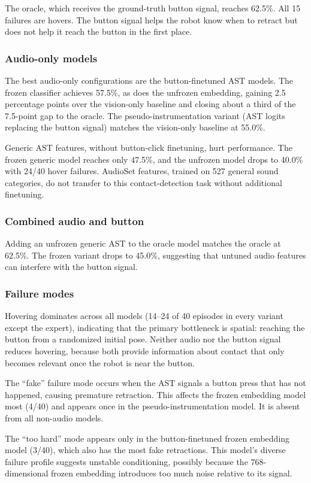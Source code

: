 \documentclass[conference]{IEEEtran}
\begin{document}
The oracle, which receives the ground-truth button signal, reaches 62.5\%.
All 15 failures are hovers.
The button signal helps the robot know when to retract but does not help it reach the button in the first place.

\subsubsection{Audio-only models}
The best audio-only configurations are the button-finetuned AST models.
The frozen classifier achieves 57.5\%, as does the unfrozen embedding, gaining 2.5 percentage points over the vision-only baseline and closing about a third of the 7.5-point gap to the oracle.
The pseudo-instrumentation variant (AST logits replacing the button signal) matches the vision-only baseline at 55.0\%.

Generic AST features, without button-click finetuning, hurt performance.
The frozen generic model reaches only 47.5\%, and the unfrozen model drops to 40.0\% with 24/40 hover failures.
AudioSet features, trained on 527 general sound categories, do not transfer to this contact-detection task without additional finetuning.

\subsubsection{Combined audio and button}
Adding an unfrozen generic AST to the oracle model matches the oracle at 62.5\%.
The frozen variant drops to 45.0\%, suggesting that untuned audio features can interfere with the button signal.

\subsubsection{Failure modes}
Hovering dominates across all models (14--24 of 40 episodes in every variant except the expert), indicating that the primary bottleneck is spatial: reaching the button from a randomized initial pose.
Neither audio nor the button signal reduces hovering, because both provide information about contact that only becomes relevant once the robot is near the button.

The ``fake'' failure mode occurs when the AST signals a button press that has not happened, causing premature retraction.
This affects the frozen embedding model most (4/40) and appears once in the pseudo-instrumentation model.
It is absent from all non-audio models.

The ``too hard'' mode appears only in the button-finetuned frozen embedding model (3/40), which also has the most fake retractions.
This model's diverse failure profile suggests unstable conditioning, possibly because the 768-dimensional frozen embedding introduces too much noise relative to its signal.
\end{document}
